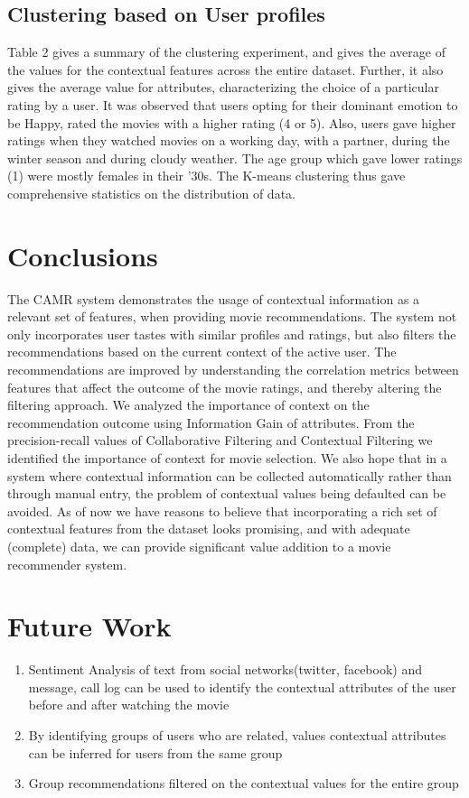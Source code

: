 \documentclass{article}
\begin{document}
\subsection{Clustering based on User profiles}
 Table 2 gives a summary of the clustering experiment, and gives the average of the values for the contextual features across the entire dataset. Further, it also gives the average value for attributes, characterizing the choice of a particular rating by a user. It was observed that users opting for their dominant emotion to be Happy, rated the movies with a higher rating (4 or 5). Also, users gave higher ratings when they watched movies on a working day, with a partner, during the winter season and during cloudy weather. The age group which gave lower ratings (1) were mostly females in their '30s. The K-means clustering thus gave comprehensive statistics on the distribution of data.

\section{Conclusions}
 The CAMR system demonstrates the usage of contextual information as a relevant set of features, when providing movie recommendations. The system not only incorporates user tastes with similar profiles and ratings, but also filters the recommendations based on the current context of the active user. The recommendations are improved by understanding the correlation metrics between features that affect the outcome of the movie ratings, and thereby altering the filtering approach. We analyzed the importance of context on the recommendation outcome using Information Gain of attributes. From the precision-recall values of Collaborative Filtering and Contextual Filtering we identified the importance of context for movie selection. We also hope that in a system where contextual information can be collected automatically rather than through manual entry, the problem of contextual values being defaulted can be avoided. As of now we have reasons to believe that incorporating a rich set of contextual features from the dataset looks promising, and with adequate (complete) data, we can provide significant value addition to a movie recommender system.

\section{Future Work}

\begin{enumerate}
\item Sentiment Analysis of text from social networks(twitter, facebook) and message, call log can be used to identify the contextual attributes of the user before and after watching the movie
\item By identifying groups of users who are related, values contextual attributes can be inferred for users from the same group
\item Group recommendations filtered on the contextual values for the entire group
\end{enumerate}
\end{document}

